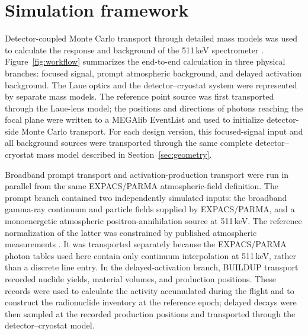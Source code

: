\documentclass[11pt]{article}
\begin{document}
\section{Simulation framework}
\label{sec:framework}

Detector-coupled Monte Carlo transport through detailed mass models was used to calculate the response and background of the 511\,keV spectrometer \cite{Sturner2003}. Figure~\ref{fig:workflow} summarizes the end-to-end calculation in three physical branches: focused signal, prompt atmospheric background, and delayed activation background. The Laue optics and the detector--cryostat system were represented by separate mass models. The reference point source was first transported through the Laue-lens model; the positions and directions of photons reaching the focal plane were written to a MEGAlib EventList and used to initialize detector-side Monte Carlo transport. For each design version, this focused-signal input and all background sources were transported through the same complete detector--cryostat mass model described in Section~\ref{sec:geometry}.

Broadband prompt transport and activation-production transport were run in parallel from the same EXPACS/PARMA atmospheric-field definition. The prompt branch contained two independently simulated inputs: the broadband gamma-ray continuum and particle fields supplied by EXPACS/PARMA, and a monoenergetic atmospheric positron-annihilation source at 511\,keV. The reference normalization of the latter was constrained by published atmospheric measurements \cite{Mahoney1981Atmospheric,Harris2003Atmospheric}. It was transported separately because the EXPACS/PARMA photon tables used here contain only continuum interpolation at 511\,keV, rather than a discrete line entry. In the delayed-activation branch, BUILDUP transport recorded nuclide yields, material volumes, and production positions. These records were used to calculate the activity accumulated during the flight and to construct the radionuclide inventory at the reference epoch; delayed decays were then sampled at the recorded production positions and transported through the detector--cryostat model.
\end{document}

